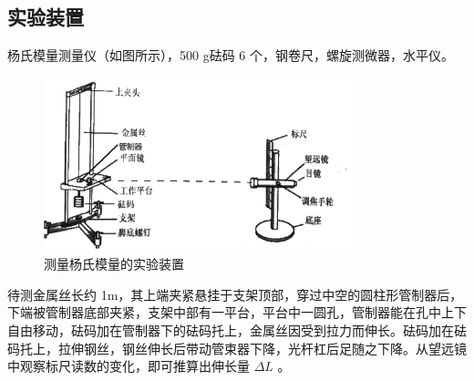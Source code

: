 \documentclass[a4paper]{extarticle}
\begin{document}
    \subsection{实验装置}
    \hspace{2em}
    杨氏模量测量仪（如图所示），500 g砝码 6 个，钢卷尺，螺旋测微器，水平仪。
    \begin{figure}[H]
        \centering
        \includegraphics[width=0.8\textwidth]{zhuangzhi.png}
        \caption{测量杨氏模量的实验装置}
    \end{figure}
    待测金属丝长约 1m，其上端夹紧悬挂于支架顶部，穿过中空的圆柱形管制器后，下端被管制器底部夹紧，支架中部有一平台，平台中一圆孔，管制器能在孔中上下自由移动，砝码加在管制器下的砝码托上，金属丝因受到拉力而伸长。砝码加在砝码托上，拉伸钢丝，钢丝伸长后带动管束器下降，光杆杠后足随之下降。从望远镜中观察标尺读数的变化，即可推算出伸长量 $\Delta L$ 。
\end{document}
